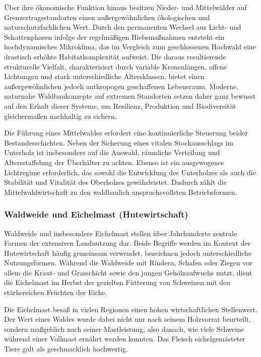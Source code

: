 \documentclass[twocolumn, bibliography=totoc, abstract=true]{scrartcl}
\begin{document}
Über ihre ökonomische Funktion hinaus besitzen Nieder- und Mittelwälder auf Grenzertragsstandorten einen außergewöhnlichen ökologischen und naturschutzfachlichen Wert. Durch den permanenten Wechsel aus Licht- und Schattenphasen infolge der regelmäßigen Hiebsmaßnahmen entsteht ein hochdynamisches Mikroklima, das im Vergleich zum geschlossenen Hochwald eine drastisch erhöhte Habitatkomplexität aufweist. Die daraus resultierende strukturelle Vielfalt, charakterisiert durch variable Kronenlängen, offene Lichtungen und stark unterschiedliche Altersklassen, bietet einen außergewöhnlichen jedoch anthropogen geschaffenen Lebensraum. Moderne, naturnahe Waldbaukonzepte auf extremen Standorten setzen daher ganz bewusst auf den Erhalt dieser Systeme, um Resilienz, Produktion und Biodiversität gleichermaßen nachhaltig zu sichern.

Die Führung eines Mittelwaldes erfordert eine kontinuierliche Steuerung beider Bestandesschichten. Neben der Sicherung eines vitalen Stockausschlags im Unterholz ist insbesondere auf die Auswahl, räumliche Verteilung und Altersstaffelung der Überhälter zu achten. Ebenso ist ein ausgewogenes Lichtregime erforderlich, das sowohl die Entwicklung des Unterholzes als auch die Stabilität und Vitalität des Oberholzes gewährleistet. Dadurch zählt die Mittelwaldwirtschaft zu den waldbaulich anspruchsvollsten Betriebsformen.

\subsubsection{Waldweide und Eichelmast (Hutewirtschaft)}

Waldweide und insbesondere Eichelmast stellen über Jahrhunderte zentrale Formen der extensiven Landnutzung dar. Beide Begriffe werden im Kontext der Hutewirtschaft häufig gemeinsam verwendet, bezeichnen jedoch unterschiedliche Nutzungsformen. Während die Waldweide mit Rindern, Schafen oder Ziegen vor allem die Kraut- und Grasschicht sowie den jungen Gehölzaufwuchs nutzt, dient die Eichelmast im Herbst der gezielten Fütterung von Schweinen mit den stärkereichen Früchten der Eiche.

Die Eichelmast besaß in vielen Regionen einen hohen wirtschaftlichen Stellenwert. Der Wert eines Waldes wurde dabei nicht nur nach seinem Holzvorrat beurteilt, sondern maßgeblich nach seiner Mastleistung, also danach, wie viele Schweine während einer Vollmast ernährt werden konnten. Das Fleisch eichelgemästeter Tiere galt als geschmacklich hochwertig.
\end{document}
